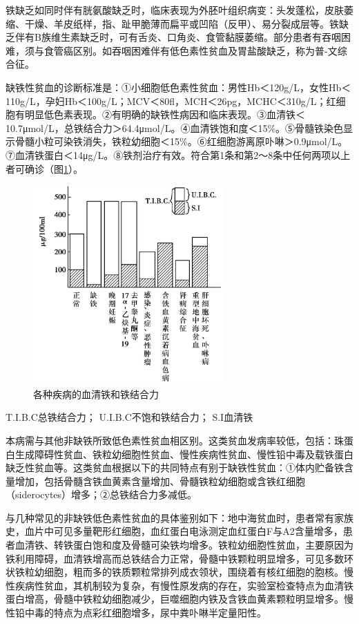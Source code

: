 铁缺乏如同时伴有胱氨酸缺乏时，临床表现为外胚叶组织病变：头发蓬松，皮肤萎缩、干燥、羊皮纸样，指、趾甲脆薄而扁平或凹陷（反甲）、易分裂成层等。铁缺乏伴有B族维生素缺乏时，可有舌炎、口角炎、食管黏膜萎缩。部分患者有吞咽困难，须与食管癌区别。如吞咽困难伴有低色素性贫血及胃盐酸缺乏，称为普-文综合征。

缺铁性贫血的诊断标准是：①小细胞低色素性贫血：男性Hb＜120g/L，女性Hb＜110g/L，孕妇Hb＜100g/L；MCV＜80fl，MCH＜26pg，MCHC＜310g/L；红细胞有明显低色素表现。②有明确的缺铁性病因和临床表现。③血清铁＜10.7μmol/L，总铁结合力＞64.4μmol/L。④血清铁饱和度＜15\%。⑤骨髓铁染色显示骨髓小粒可染铁消失，铁粒幼细胞＜15\%。⑥红细胞游离原卟啉＞0.9μmol/L。⑦血清铁蛋白＜14μg/L。⑧铁剂治疗有效。符合第1条和第2～8条中任何两项以上者可确诊（图\ref{fig33-7}）。

\begin{figure}[!htbp]
 \centering
 \includegraphics[width=2.875in,height=3in]{./images/Image00184.jpg}
 \captionsetup{justification=centering}
 \caption{各种疾病的血清铁和铁结合力}
 \label{fig33-7}
  \end{figure} 

T.I.B.C总铁结合力； U.I.B.C不饱和铁结合力； S.I血清铁

本病需与其他非缺铁所致低色素性贫血相区别。这类贫血发病率较低，包括：珠蛋白生成障碍性贫血、铁粒幼细胞性贫血、慢性疾病性贫血、慢性铅中毒及载铁蛋白缺乏性贫血等。这类贫血根据以下的共同特点有别于缺铁性贫血：①体内贮备铁含量增加，包括骨髓含铁血黄素含量增加、骨髓铁粒幼细胞或含铁红细胞（siderocytes）增多；②总铁结合力多减低。

与几种常见的非缺铁低色素性贫血的具体鉴别如下：地中海贫血时，患者常有家族史，血片中可见多量靶形红细胞，血红蛋白电泳测定血红蛋白F与A2含量增多，患者血清铁、转铁蛋白饱和度及骨髓可染铁均增多。铁粒幼细胞性贫血，主要原因为铁利用障碍，血清铁增高而总铁结合力正常，骨髓中铁颗粒明显增多，可见多数环状铁粒幼细胞，粗而多的铁质颗粒常排列成衣领状，围绕着有核红细胞的胞核。慢性疾病性贫血，其机制较为复杂，有慢性原发病的存在，实验室检查特点为血清铁蛋白增高，骨髓中铁粒幼细胞减少，巨噬细胞内铁及含铁血黄素颗粒明显增多。慢性铅中毒的特点为点彩红细胞增多，尿中粪卟啉半定量阳性。

